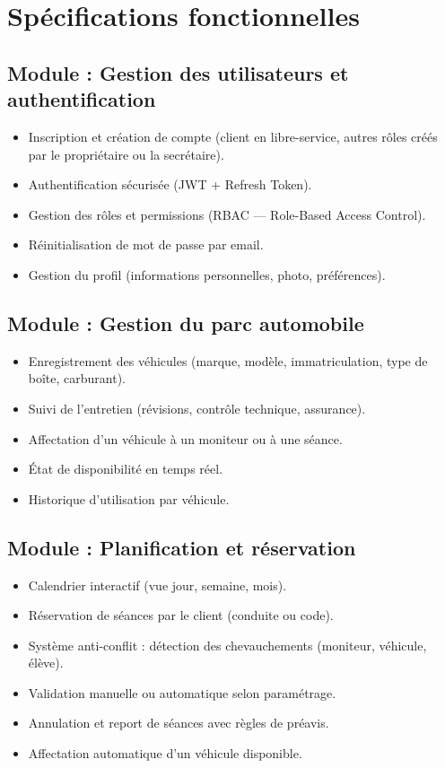 \documentclass[12pt,a4paper]{article}
\begin{document}
\section{Spécifications fonctionnelles}

\subsection{Module : Gestion des utilisateurs et authentification}

\begin{itemize}[leftmargin=*,itemsep=4pt]
    \item Inscription et création de compte (client en libre-service, autres rôles créés par le propriétaire ou la secrétaire).
    \item Authentification sécurisée (JWT + Refresh Token).
    \item Gestion des rôles et permissions (RBAC --- Role-Based Access Control).
    \item Réinitialisation de mot de passe par email.
    \item Gestion du profil (informations personnelles, photo, préférences).
\end{itemize}

\subsection{Module : Gestion du parc automobile}

\begin{itemize}[leftmargin=*,itemsep=4pt]
    \item Enregistrement des véhicules (marque, modèle, immatriculation, type de boîte, carburant).
    \item Suivi de l'entretien (révisions, contrôle technique, assurance).
    \item Affectation d'un véhicule à un moniteur ou à une séance.
    \item État de disponibilité en temps réel.
    \item Historique d'utilisation par véhicule.
\end{itemize}

\subsection{Module : Planification et réservation}

\begin{itemize}[leftmargin=*,itemsep=4pt]
    \item Calendrier interactif (vue jour, semaine, mois).
    \item Réservation de séances par le client (conduite ou code).
    \item Système anti-conflit : détection des chevauchements (moniteur, véhicule, élève).
    \item Validation manuelle ou automatique selon paramétrage.
    \item Annulation et report de séances avec règles de préavis.
    \item Affectation automatique d'un véhicule disponible.
\end{itemize}
\end{document}
